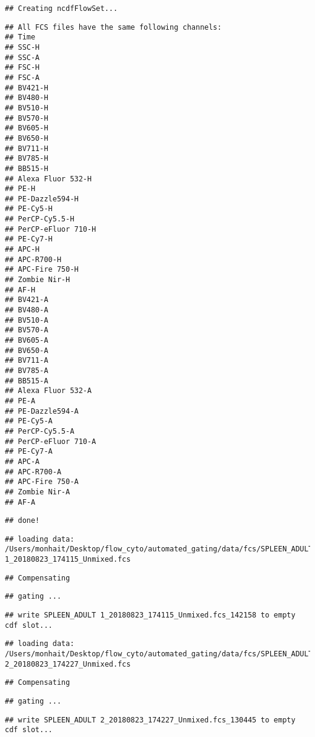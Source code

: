 \documentclass[]{book}
\begin{document}
\begin{verbatim}
## Creating ncdfFlowSet...
\end{verbatim}

\begin{verbatim}
## All FCS files have the same following channels:
## Time
## SSC-H
## SSC-A
## FSC-H
## FSC-A
## BV421-H
## BV480-H
## BV510-H
## BV570-H
## BV605-H
## BV650-H
## BV711-H
## BV785-H
## BB515-H
## Alexa Fluor 532-H
## PE-H
## PE-Dazzle594-H
## PE-Cy5-H
## PerCP-Cy5.5-H
## PerCP-eFluor 710-H
## PE-Cy7-H
## APC-H
## APC-R700-H
## APC-Fire 750-H
## Zombie Nir-H
## AF-H
## BV421-A
## BV480-A
## BV510-A
## BV570-A
## BV605-A
## BV650-A
## BV711-A
## BV785-A
## BB515-A
## Alexa Fluor 532-A
## PE-A
## PE-Dazzle594-A
## PE-Cy5-A
## PerCP-Cy5.5-A
## PerCP-eFluor 710-A
## PE-Cy7-A
## APC-A
## APC-R700-A
## APC-Fire 750-A
## Zombie Nir-A
## AF-A
\end{verbatim}

\begin{verbatim}
## done!
\end{verbatim}

\begin{verbatim}
## loading data: /Users/monhait/Desktop/flow_cyto/automated_gating/data/fcs/SPLEEN_ADULT 1_20180823_174115_Unmixed.fcs
\end{verbatim}

\begin{verbatim}
## Compensating
\end{verbatim}

\begin{verbatim}
## gating ...
\end{verbatim}

\begin{verbatim}
## write SPLEEN_ADULT 1_20180823_174115_Unmixed.fcs_142158 to empty cdf slot...
\end{verbatim}

\begin{verbatim}
## loading data: /Users/monhait/Desktop/flow_cyto/automated_gating/data/fcs/SPLEEN_ADULT 2_20180823_174227_Unmixed.fcs
\end{verbatim}

\begin{verbatim}
## Compensating
\end{verbatim}

\begin{verbatim}
## gating ...
\end{verbatim}

\begin{verbatim}
## write SPLEEN_ADULT 2_20180823_174227_Unmixed.fcs_130445 to empty cdf slot...
\end{verbatim}
\end{document}
